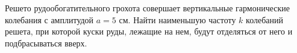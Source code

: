Решето рудообогатительного грохота
совершает вертикальные гармонические колебания с амплитудой $a = 5$ см.
Найти наименьшую частоту $k$ колебаний решета,
при которой куски руды, лежащие на нем,
будут отделяться от него и подбрасываться вверх.
